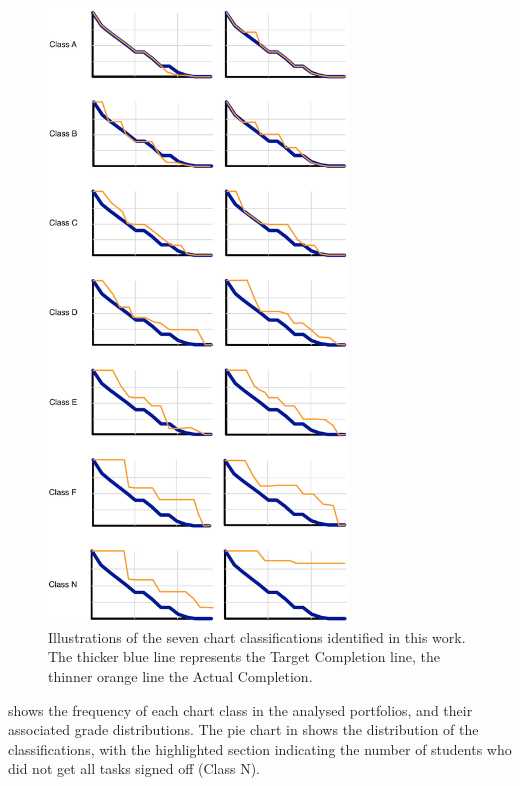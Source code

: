 \begin{figure}[p]
  \centering
  \includegraphics[width=0.71\textwidth]{CharTypes}
  \caption{Illustrations of the seven chart classifications identified in this work. The thicker blue line represents the Target Completion line, the thinner orange line the Actual Completion.}
  \label{fig:chart_types}
\end{figure}

 shows the frequency of each chart class in the analysed portfolios, and their associated grade distributions. The pie chart in  shows the distribution of the classifications, with the highlighted section indicating the number of students who did not get all tasks signed off (Class N).

